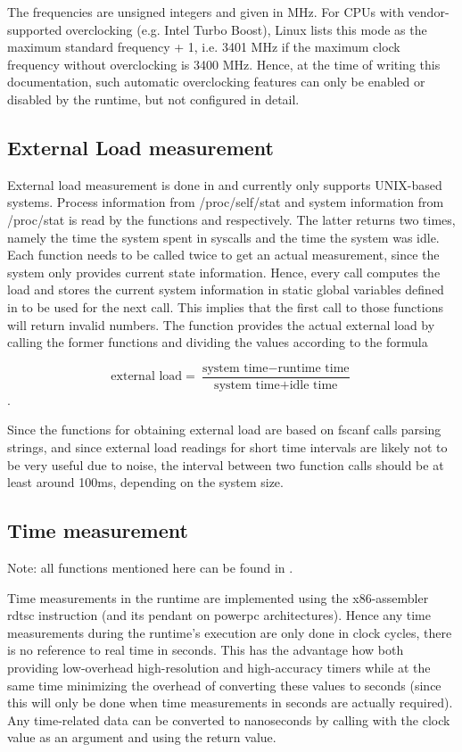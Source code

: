 The frequencies are unsigned integers and given in MHz. For CPUs with vendor-supported overclocking (e.g. Intel Turbo Boost), Linux lists this mode as the maximum standard frequency + 1, i.e. 3401 MHz if the maximum clock frequency without overclocking is 3400 MHz. Hence, at the time of writing this documentation, such automatic overclocking features can only be enabled or disabled by the runtime, but not configured in detail.

\subsection{External Load measurement}

External load measurement is done in  and currently only supports UNIX-based systems. Process information from
/proc/self/stat and system information from /proc/stat is read by the functions
 and  respectively.
The latter returns two times, namely the time the system spent in syscalls and
the time the system was idle. Each function needs to be called twice to get an
actual measurement, since the system only provides current state information.
Hence, every call computes the load and stores the current system information
in static global variables defined in  to be used for the next
call. This implies that the first call to those functions will return invalid
numbers. The function  provides the actual
external load by calling the former functions and dividing the values according
to the formula

\[ \text{external load} = \frac{\text{system time} - \text{runtime
time}}{\text{system time} + \text{idle time}} \].

Since the functions for obtaining external load are based on fscanf calls
parsing strings, and since external load readings for short time intervals are
likely not to be very useful due to noise, the interval between two
 function calls should be at least around
100ms, depending on the system size.

\subsection{Time measurement} 
\label{sec:runtime.time.measurement}

Note: all functions mentioned here can be found in .


Time measurements in the runtime are implemented using the x86-assembler rdtsc
instruction (and its pendant on powerpc architectures). Hence any time
measurements during the runtime's execution are only done in clock cycles, there
is no reference to real time in seconds. This has the advantage how both
providing low-overhead high-resolution and high-accuracy timers while at the
same time minimizing the overhead of converting these values to seconds (since
this will only be done when time measurements in seconds are actually required).
Any time-related data can be converted to nanoseconds by calling
 with the clock value as an
argument and using the return value.

